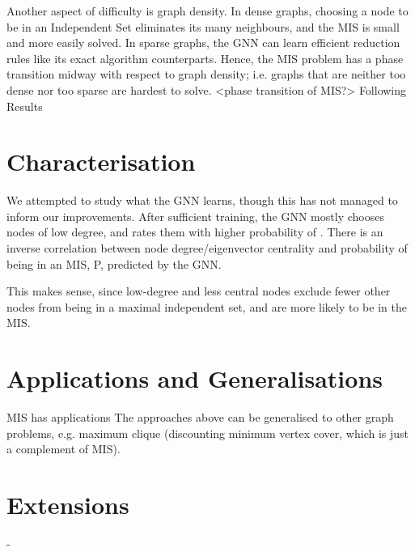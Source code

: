 \documentclass{article}
\begin{document}
Another aspect of difficulty is graph density. In dense graphs, choosing a node to be in an Independent Set eliminates its many neighbours, and the MIS is small and more easily solved. In sparse graphs, the GNN can learn efficient reduction rules like its exact algorithm counterparts. Hence, the MIS problem has a phase transition midway with respect to graph density; i.e. graphs that are neither too dense nor too sparse are hardest to solve. <phase transition of MIS?> Following
Results


\section{Characterisation}
We attempted to study what the GNN learns, though this has not managed to inform our improvements.
After sufficient training, the GNN mostly chooses nodes of low degree, and rates them with higher probability of . There is an inverse correlation between node degree/eigenvector centrality and probability of being in an MIS, P, predicted by the GNN.


This makes sense, since low-degree and less central nodes exclude fewer other nodes from being in a maximal independent set, and are more likely to be in the MIS.
\section{Applications and Generalisations}
MIS has applications
The approaches above can be generalised to other graph problems, e.g. maximum clique (discounting minimum vertex cover, which is just a complement of MIS).
\section{Extensions}
-
\end{document}
